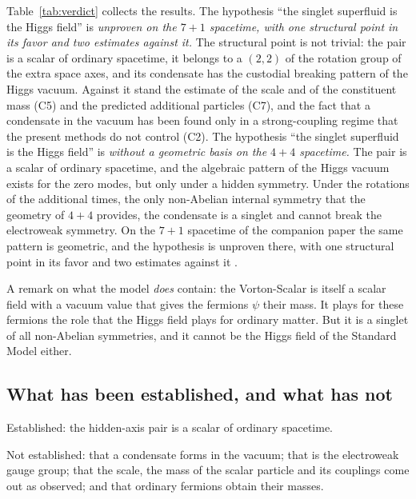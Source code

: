 Table~\ref{tab:verdict} collects the results.
The hypothesis ``the singlet superfluid is the Higgs field'' is \emph{unproven on the $7+1$
spacetime, with one structural point in its favor and two estimates against it.} The structural
point is not trivial: the pair is a scalar of ordinary spacetime, it belongs to a $(2,2)$ of the
rotation group of the extra space axes, and its condensate has the custodial breaking pattern of the
Higgs vacuum. Against it stand the estimate of the scale and of the constituent mass (C5) and the
predicted additional particles (C7), and the fact that a condensate in the vacuum has been found only
in a strong-coupling regime that the present methods do not control (C2).
The hypothesis ``the singlet superfluid is the Higgs field'' is \emph{without a geometric basis on the
$4+4$ spacetime.} The pair is a scalar of ordinary spacetime, and the algebraic pattern of the Higgs
vacuum exists for the zero modes, but only under a hidden symmetry. Under the rotations of the
additional times, the only non-Abelian internal symmetry that the geometry of $4+4$ provides, the
condensate is a singlet and cannot break the electroweak symmetry. On the $7+1$ spacetime of the
companion paper the same pattern is geometric, and the hypothesis is unproven there, with one
structural point in its favor and two estimates against it \cite{Companion1671}.

A remark on what the model \emph{does} contain: the Vorton-Scalar is itself a scalar field with a
vacuum value that gives the fermions $\psi$ their mass. It plays for these fermions the role that the
Higgs field plays for ordinary matter. But it is a singlet of all non-Abelian symmetries, and it
cannot be the Higgs field of the Standard Model either.

\subsection{What has been established, and what has not}

Established: the hidden-axis pair is a scalar of ordinary spacetime.

Not established: that a condensate forms in the vacuum; that
 is the electroweak gauge
group; that the scale, the mass of the scalar particle and its couplings come out as observed; and
that ordinary fermions obtain their masses.
